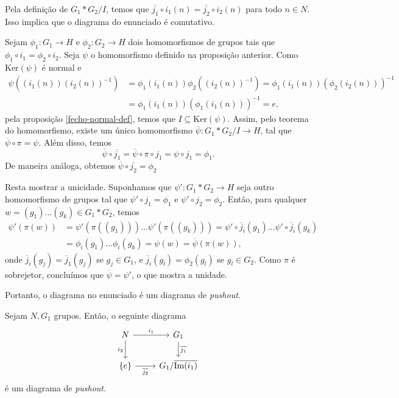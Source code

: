 \begin{dem}
    Pela definição de $G_1*G_2/I$, temos que $\overline{j_1}\circ i_1(n)=\overline{j_2}\circ i_2(n)$ para todo $n\in N$. Isso implica que o diagrama do enunciado é comutativo.
    
    Sejam $\phi_1:G_1\rightarrow H$ e $\phi_2: G_2\rightarrow H$ dois homomorfismos de grupos tais que $\phi_1\circ i_1=\phi_2\circ i_2$. Seja $\psi$ o homomorfismo definido na proposição anterior. Como $\text{Ker}(\psi)$ é normal e 
    \begin{align*}
        \psi((i_1(n))(i_2(n))^{-1})&=\phi_1(i_1(n))\phi_2((i_2(n))^{-1})=\phi_1(i_1(n))(\phi_2(i_2(n)))^{-1}\\
        &=\phi_1(i_1(n))(\phi_1(i_1(n)))^{-1}=e,
    \end{align*}
    pela proposição \ref{fecho-normal-def}, temos que $I\subseteq\text{Ker}(\psi)$. Assim, pelo teorema do homomorfismo, existe um único homomorfismo $\overline{\psi}:G_1*G_2/I\rightarrow H$, tal que $\overline{\psi}\circ \pi=\psi$. Além disso, temos 
    \[\overline{\psi}\circ \overline{j_1}=\overline{\psi}\circ \pi\circ j_1=\psi\circ j_1=\phi_1.\]
    De maneira análoga, obtemos $\overline{\psi}\circ\overline{j_2}=\phi_2$

    Resta mostrar a unicidade. Suponhamos que $\psi':G_1*G_2\rightarrow H$ seja outro homomorfismo de grupos tal que $\psi'\circ j_1=\phi_1$ e $\psi'\circ j_2=\phi_2$. Então, para qualquer $w=(g_1)...(g_k)\in G_1* G_2$, temos 
    \begin{align*}
        \psi'(\pi(w))&=\psi'(\pi((g_1)))...\psi'(\pi((g_k)))=\psi'\circ\overline{j}_i(g_1)...\psi'\circ\overline{j}_i(g_k)\\
        &=\phi_i(g_1)...\phi_i(g_k)=\psi(w)=\overline{\psi}(\pi(w)),
    \end{align*}
    onde $\overline{j}_i(g_j)=\overline{j}_1(g_j)$ se $g_j\in G_1$, e $\overline{j}_i(g_l)=\phi_2(g_l)$ se $g_l\in G_2$. Como $\pi$ é sobrejetor, concluímos que $\overline{\psi}=\psi'$, o que mostra a unidade.

    Portanto, o diagrama no enunciado é um diagrama de \emph{pushout}.
\end{dem}

\begin{corol}
Sejam $N,G_1$ grupos. Então, o seguinte diagrama 
\[\begin{tikzcd}
	N & {G_1} \\
	{\{e\}} & {G_1/\overline{\text{Im}(i_1)}}
	\arrow["{i_1}", from=1-1, to=1-2]
	\arrow["{i_2}"', from=1-1, to=2-1]
	\arrow["{\overline{j_1}}", from=1-2, to=2-2]
	\arrow["{\overline{j_2}}"', from=2-1, to=2-2]
\end{tikzcd}\]
é um diagrama de \emph{pushout}.
\end{corol}

